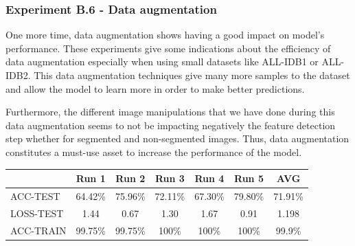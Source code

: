 \documentclass[11pt, openany]{report}
\theoremstyle{plain}
\theoremstyle{definition}
\theoremstyle{remark}
\begin{document}
\subsubsection{Experiment B.6 - Data augmentation}

One more time, data augmentation shows having a good impact on model's performance. These experiments give some indications about the efficiency of data augmentation especially when using small datasets like ALL-IDB1 or ALL-IDB2. This data augmentation techniques give many more samples to the dataset and allow the model to learn more in order to make better predictions. 

Furthermore, the different image manipulations that we have done during this data augmentation seems to not be impacting negatively the feature detection step whether for segmented and non-segmented images. Thus, data augmentation constitutes a must-use asset to increase the performance of the model.  

\begin{center}
\begin{tabular}{|l|c|c|c|c|c|c|}
  \hline
   & \textbf{Run 1} & \textbf{Run 2} & \textbf{Run 3} & \textbf{Run 4} & \textbf{Run 5} & \textbf{AVG}\\
  \hline
  ACC-TEST & 64.42\% & 75.96\% & 72.11\% & 67.30\% & 79.80\% & 71.91\% \\
  LOSS-TEST & 1.44 & 0.67 & 1.30 & 1.67 & 0.91 & 1.198 \\ 
  ACC-TRAIN & 99.75\% & 99.75\% & 100\% & 100\% & 100\% & 99.9\% \\ 
  \hline
\end{tabular}
\label{table:results-B6}
\end{center}
\end{document}
